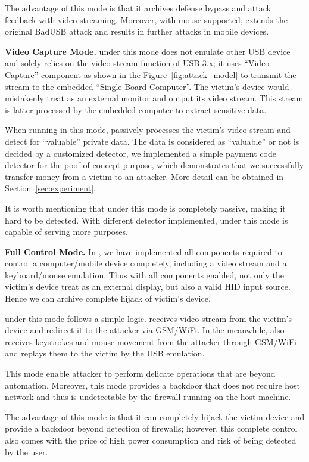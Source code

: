 The advantage of this mode is that it archives defense bypass and attack
feedback with video streaming.  
Moreover, with mouse
supported, \tool extends the original BadUSB attack and results in further attacks in
mobile devices.

\textbf{Video Capture Mode.} \tool under this mode does not emulate other
USB device and solely relies on the video stream function of USB 3.x; it uses
``Video Capture'' component as shown in the Figure~\ref{fig:attack_model} to transmit the stream to the embedded ``Single Board Computer''.
The victim's device would mistakenly treat \tool as an external monitor
and output its video stream. This stream is latter processed by the embedded
computer to extract sensitive data.

When running in this mode, \tool passively processes the victim's video stream
and detect for ``valuable'' private data.  The data is considered as
``valuable'' or not is decided by a customized detector, we implemented a simple
payment code detector for the poof-of-concept purpose, which demonstrates that we successfully transfer money from a victim to an
attacker. More detail can be obtained in Section~\ref{sec:experiment}.

It is worth mentioning that \tool under this mode is completely passive, making
it hard to be detected. With different detector implemented, \tool
under this mode is capable of serving more purposes.

\textbf{Full Control Mode.} In \tool, we have implemented all components
required to control a computer/mobile device completely, including a video stream
and a keyboard/mouse emulation. Thus with all components enabled, not only
the victim's device treat \tool as an external display, but also a valid HID
input source. Hence we can archive complete hijack of victim's device.

\tool under this mode follows a simple logic. \tool receives video stream
from the victim's device and redirect it to the attacker via GSM/WiFi. In the
meanwhile, \tool also receives keystrokes and mouse movement from the attacker
through GSM/WiFi and replays them to the victim by the USB emulation.

This mode enable attacker to perform delicate operations that are beyond
automation. Moreover, this mode provides a backdoor that does not require host
network and thus is undetectable by the firewall running on the host machine.

The advantage of this mode is that it can completely hijack the victim device
and provide a backdoor beyond detection of firewalls; however, this complete control
also comes with the price of high power consumption and risk of being detected
by the user.

